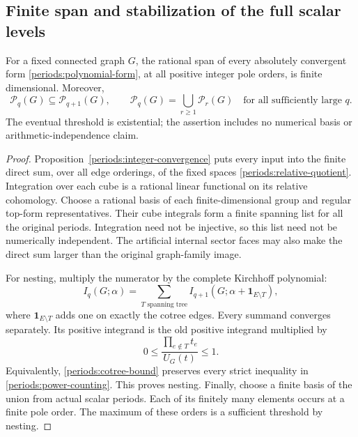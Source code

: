 \subsection{Finite span and stabilization of the full scalar levels}
\label{periods:stabilization}

\begin{theorem}
\label{periods:finite-span}
For a fixed connected graph $G$, the rational span of every absolutely
convergent form \eqref{periods:polynomial-form}, at all positive integer
pole orders, is finite dimensional.  Moreover,
\begin{equation}
 \mathcal P_q(G)\subseteq\mathcal P_{q+1}(G),
 \qquad
 \mathcal P_q(G)=\bigcup_{r\ge1}\mathcal P_r(G)
 \quad\text{for all sufficiently large }q.
 \label{periods:stabilization-equation}
\end{equation}
The eventual threshold is existential; the assertion includes no
numerical basis or arithmetic-independence claim.
\end{theorem}

\begin{proof}
Proposition~\ref{periods:integer-convergence} puts every input into the
finite direct sum, over all edge orderings, of the fixed spaces
\eqref{periods:relative-quotient}.  Integration over each cube is a
rational linear functional on its relative cohomology.  Choose a rational
basis of each finite-dimensional group and regular top-form representatives.
Their cube integrals form a finite spanning list for all the original
periods.  Integration need not be injective, so this list need not be
numerically independent.  The artificial internal sector faces may
also make the direct sum larger than the original graph-family image.

For nesting, multiply the numerator by the complete Kirchhoff polynomial:
\begin{equation}
 I_q(G;\alpha)=
 \sum_{T\text{ spanning tree}}
 I_{q+1}(G;\alpha+\mathbf1_{E\setminus T}),
 \label{periods:dimension-shift}
\end{equation}
where $\mathbf1_{E\setminus T}$ adds one on exactly the cotree edges.
Every summand converges separately.  Its positive integrand is the old
positive integrand multiplied by
\begin{equation}
 0\le \frac{\prod_{e\notin T}t_e}{U_G(t)}\le1.
 \label{periods:dominated-shift}
\end{equation}
Equivalently, \eqref{periods:cotree-bound} preserves every strict
inequality in \eqref{periods:power-counting}.  This proves nesting.
Finally, choose a finite basis of the union from actual scalar periods.
Each of its finitely many elements occurs at a finite pole order.  The
maximum of these orders is a sufficient threshold by nesting.
\end{proof}

